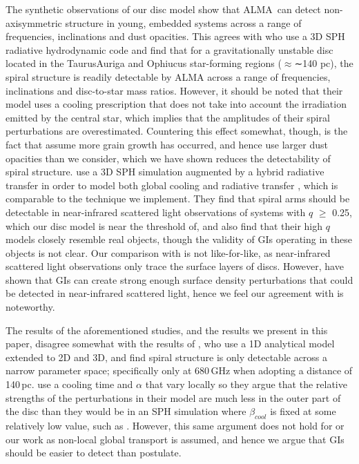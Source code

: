 \documentclass[fleqn,usenatbib]{mnras}
\newcommand{\alma}{ALMA}
\begin{document}
The synthetic observations of our disc model show that \alma\ can detect non-axisymmetric structure in young, embedded systems across a range of frequencies, inclinations and dust opacities. This agrees with \citet{Dipierro&Lodato2014} who use a 3D SPH radiative hydrodynamic code \citep{Lodato&Rice2004} and find that for a gravitationally unstable disc located in the TaurusAuriga and Ophiucus star-forming regions ($\approx$∼140 pc), the spiral structure is readily detectable by ALMA across a range of frequencies, inclinations and disc-to-star mass ratios. However, it should be noted that their model uses a cooling prescription that does not take into account the irradiation emitted by the central star, which implies that the amplitudes of their spiral perturbations are overestimated. Countering this effect somewhat, though, is the fact that \citet{Dipierro&Lodato2014} assume more grain growth has occurred, and hence use larger dust opacities than we consider, which we have shown reduces the detectability of spiral structure. \citet{Dong&Hall2015} use a 3D SPH simulation augmented by a hybrid radiative transfer in order to model both global cooling and radiative transfer \citep{Forgan&Rice2009}, which is comparable to the technique we implement. They find that spiral arms should be detectable in near-infrared scattered light observations of systems with $q$ $\geq$ 0.25, which our disc model is near the threshold of, and also find that their high $q$ models closely resemble real objects, though the validity of GIs operating in these objects is not clear. Our comparison with \citet{Dong&Hall2015} is not like-for-like, as near-infrared scattered light observations only trace the surface layers of discs. However, \citet{Dipierro&Pinilla2015} have shown that GIs can create strong enough surface density perturbations that could be detected in near-infrared scattered light, hence we feel our agreement with \citet{Dong&Hall2015} is noteworthy.

\smallskip

The results of the aforementioned studies, and the results we present in this paper, disagree somewhat with the results of \citet{Hall&Forgan2016}, who use a 1D analytical model \citep{Clarke2009} extended to 2D and 3D, and find spiral structure is only detectable across a narrow parameter space; specifically only at 680\,GHz when adopting a distance of 140\,pc. \citet{Hall&Forgan2016} use a cooling time and $\alpha$ that vary locally so they argue that the relative strengths of the perturbations in their model are much less in the outer part of the disc than they would be in an SPH simulation where $\beta_{cool}$ is fixed at some relatively low value, such as \citet{Dipierro&Lodato2014}. However, this same argument does not hold for \citet{Dong&Hall2015} or our work as non-local global transport is assumed, and hence we argue that GIs should be easier to detect than \citet{Hall&Forgan2016} postulate.
\end{document}
